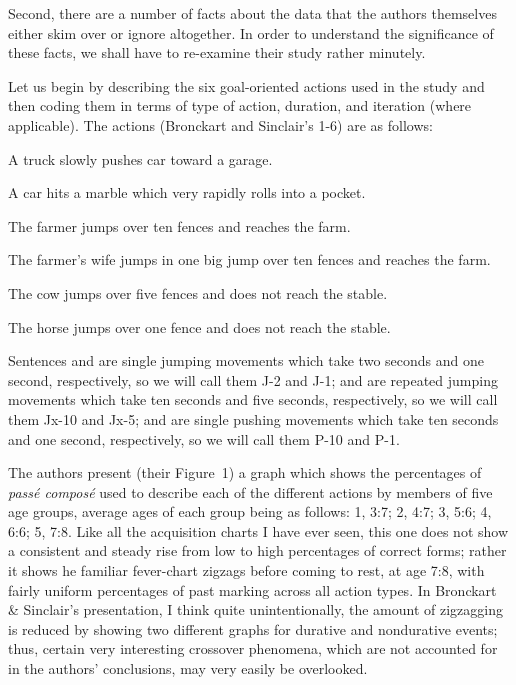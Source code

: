 Second, there are a number of facts about the \citeauthor{BrockartEtAl1973} data that the authors themselves either skim over or ignore altogether. In order to understand the significance of these facts, we shall have to re-examine their study rather minutely.

Let us begin by describing the six goal-oriented actions used in the study and then coding them in terms of type of action, duration, and iteration (where applicable). The actions (Bronckart and Sinclair's 1-6) are as follows:

\ea\label{ex:3:16}
 A truck slowly pushes car toward a garage.
\z

\ea\label{ex:3:17}
 A car hits a marble which very rapidly rolls into a pocket.
\z

\ea\label{ex:3:18}
 The farmer jumps over ten fences and reaches the farm.
\z

\ea\label{ex:3:19}
 The farmer's wife jumps in one big jump over ten fences and reaches the farm.
\z

\ea\label{ex:3:20}
 The cow jumps over five fences and does not reach the stable.
\z

\ea\label{ex:3:21}
 The horse jumps over one fence and does not reach the stable.
\z




Sentences  and  are single jumping movements which take two seconds and one second, respectively, so we will call them J-2 and J-1;  and  are repeated jumping movements which take ten seconds and five seconds, respectively, so we will call them Jx-10 and Jx-5;  and  are single pushing movements which take ten seconds and one second, respectively, so we will call them P-10 and P-1.

The authors present (their Figure~1) a graph which shows the percentages of \textit{pass\'e compos\'e} used to describe each of the different actions by members of five age groups, average ages of each group being as follows: 1, 3:7; 2, 4:7; 3, 5:6; 4, 6:6; 5, 7:8. Like all the acquisition charts I have ever seen, this one does not show a consistent and steady rise from low to high percentages of correct forms; rather it shows he familiar fever-chart zigzags before coming to rest, at age 7:8, with fairly uniform percentages of past marking across all action types. In Bronckart \& Sinclair's presentation, I think quite unintentionally, the amount of zigzagging is reduced by showing two different graphs for durative and nondurative events; thus, certain very interesting crossover phenomena, which are not accounted for in the authors' conclusions, may very easily be overlooked.

